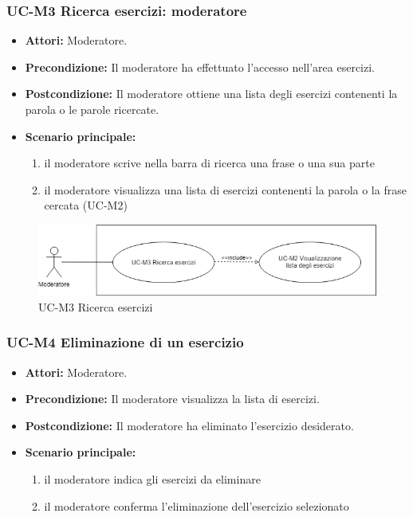 \subsubsection{UC-M3 Ricerca esercizi: moderatore}
	\begin{itemize}
		\item \textbf{Attori:} Moderatore.
		\item \textbf{Precondizione:} Il moderatore ha effettuato l'accesso nell'area esercizi.
		\item \textbf{Postcondizione:} Il moderatore ottiene una lista degli esercizi contenenti la parola o le parole ricercate.
		\item \textbf{Scenario principale:}
			\begin{enumerate}
				\item il moderatore scrive nella barra di ricerca una frase o una sua parte
				\item il moderatore visualizza una lista di esercizi contenenti la parola o la frase cercata (UC-M2)
			\end{enumerate}
	\end{itemize}
	
	\begin{figure}[h]
		\centering
		\includegraphics[scale=0.7]{images/UC-M3.png}
		\caption{UC-M3 Ricerca esercizi}
	\end{figure}	
	
\subsubsection{UC-M4 Eliminazione di un esercizio}
			\begin{itemize}
			\item \textbf{Attori:} Moderatore.
			\item \textbf{Precondizione:} Il moderatore visualizza la lista di esercizi.
			\item \textbf{Postcondizione:} Il moderatore ha eliminato l'esercizio desiderato.
			\item \textbf{Scenario principale:}
				\begin{enumerate}
					\item il moderatore indica gli esercizi da eliminare
					\item il moderatore conferma l'eliminazione dell'esercizio selezionato
				\end{enumerate}
		\end{itemize}

